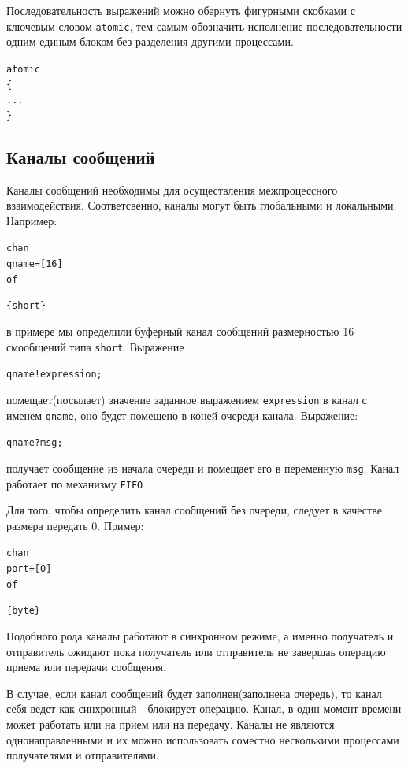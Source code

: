 \documentclass[12pt, twoside]{report}
\newcommand{\cname}[1] {
\textcolor{atnotation}{#1}
}
\begin{document}
Последовательность выражений можно обернуть фигурными скобками с ключевым словом \texttt{atomic},
тем самым обозначить исполнение последовательности одним единым блоком без разделения другими процессами.

\begin{alltt}
\cname{atomic} \{
  ...
\}
\end{alltt}


\subsection*{Каналы сообщений}\label{promela_language_CHAN}

Каналы сообщений необходимы для осуществления межпроцессного взаимодействия.
Соответсвенно, каналы могут быть глобальными и локальными. Например:

\begin{alltt}
\cname{chan} qname = [16] \cname{of} \cname{\{short\}}
\end{alltt}

в примере мы определили буферный канал сообщений размерностью 16 смообщений типа
\texttt{short}. Выражение

\begin{alltt}
qname ! expression;
\end{alltt}

помещает(посылает) значение заданное выражением \texttt{expression} в канал с именем
\texttt{qname}, оно будет помещено в коней очереди канала. Выражение:

\begin{alltt}
qname ? msg;
\end{alltt}

получает сообщение из начала очереди и помещает его в переменную \texttt{msg}.
Канал работает по механизму \texttt{FIFO}

Для того, чтобы определить канал сообщений без очереди, следует в качестве размера передать 0.
Пример:

\begin{alltt}
\cname{chan} port = [0] \cname{of} \cname{\{byte\}}
\end{alltt}

Подобного рода каналы работают в синхронном режиме, а именно получатель и отправитель ожидают
пока получатель или отправитель не завершаь операцию приема или передачи сообщения.

В случае, если канал сообщений будет заполнен(заполнена очередь), то канал себя ведет как синхронный
- блокирует операцию. Канал, в один момент времени может работать или на прием или на передачу.
Каналы не являются однонаправленными и их можно использовать соместно несколькими процессами
получателями и отправителями.
\end{document}
